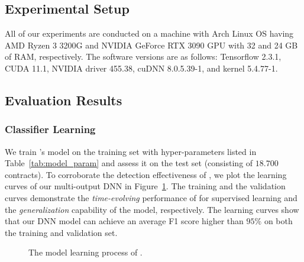 \subsection{Experimental Setup}
\label{sec:evaluation:setup}
All of our experiments are conducted on a machine with Arch Linux OS having AMD Ryzen 3 3200G and NVIDIA GeForce RTX 3090 GPU with 32 and 24 GB of RAM, respectively. The software versions are as follows: Tensorflow 2.3.1, CUDA 11.1, NVIDIA driver 455.38, cuDNN 8.0.5.39-1, and kernel 5.4.77-1.

\vspace{-0.3em}
\subsection{Evaluation Results}
\label{sec:evaluation:results}
\subsubsection{Classifier Learning}
We train \sys{}'s model on the training set with hyper-parameters listed in Table~\ref{tab:model_param} and assess it on the test set {(consisting of $18.700$ contracts)}.
To corroborate the detection effectiveness of \sys{}, we plot the learning curves of our multi-output DNN 
in Figure~\ref{fig:metrics-training-part1}. 
The training and the validation curves demonstrate the \textit{time-evolving} performance of \sys{} for supervised learning and the \textit{generalization} capability of the model, respectively. 
The learning curves show that our DNN model can achieve an average F1 score higher than $95\%$ on both the training and validation set.  

\begin{figure}[h]
  \centering
  
  \vspace{-0.8em}
  \vspace{-0.5em}
  \caption{The model learning process of \sys{}. 
  }
  \label{fig:metrics-training-part1}
\end{figure}

\vspace{0.8em}

